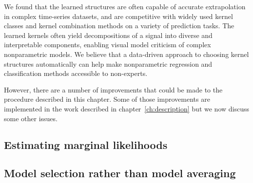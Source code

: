 We found that the learned structures are often capable of accurate extrapolation in complex time-series datasets, and are competitive with widely used kernel classes and kernel combination methods on a variety of prediction tasks.
The learned kernels often yield decompositions of a signal into diverse and interpretable components, enabling visual model criticism of complex nonparametric models.
We believe that a data-driven approach to choosing kernel structures automatically can help make nonparametric regression and classification methods accessible to non-experts.

However, there are a number of improvements that could be made to the procedure described in this chapter.
Some of those improvements are implemented in the work described in chapter~\ref{ch:description} but we now discuss some other issues.

\subsection{Estimating marginal likelihoods}


\subsection{Model selection rather than model averaging}


\outbpdocument{


}
